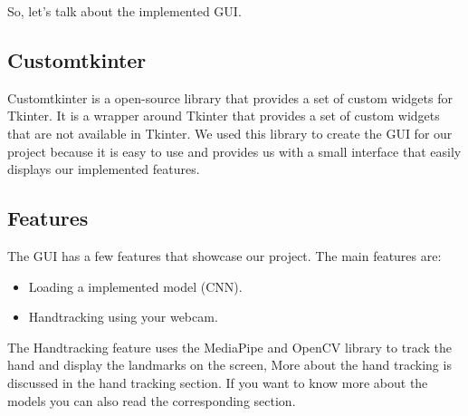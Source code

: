 \documentclass[../paper.tex]{subfiles}
\begin{document}
    So, let's talk about the implemented GUI.\@
    \subsection{Customtkinter}
    Customtkinter is a open-source library that provides a set of custom widgets for Tkinter. 
    It is a wrapper around Tkinter that provides a set of custom widgets that are not available in Tkinter.
    We used this library to create the GUI for our project because it is easy to use and provides us with a small interface that 
    easily displays our implemented features.
    \subsection{Features}
    The GUI has a few features that showcase our project. The main features are:
    \begin{itemize}
        \item Loading a implemented model (CNN).
        \item Handtracking using your webcam.
    \end{itemize}
    The Handtracking feature uses the MediaPipe and OpenCV library to track the hand and display the landmarks on the screen,
    More about the hand tracking is discussed in the hand tracking section. If you want to know more about the models you can 
    also read the corresponding section.
\end{document}
